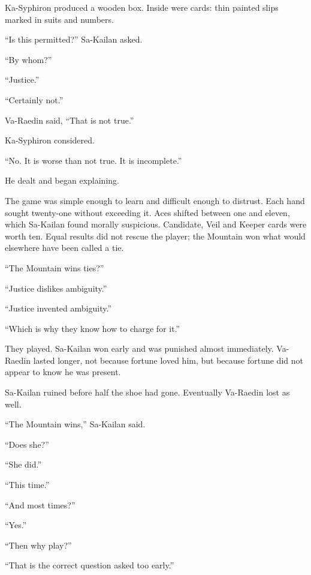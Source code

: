 Ka-Syphiron produced a wooden box.
Inside were cards: thin painted slips marked in suits and numbers.\par

“Is this permitted?” Sa-Kailan asked.\par

“By whom?”\par

“Justice.”\par

“Certainly not.”\par

Va-Raedin said, “That is not true.”\par

Ka-Syphiron considered.\par

“No.
It is worse than not true.
It is incomplete.”\par

He dealt and began explaining.\par

The game was simple enough to learn and difficult enough to distrust.
Each hand sought twenty-one without exceeding it.
Aces shifted between one and eleven, which Sa-Kailan found morally suspicious.
Candidate, Veil and Keeper cards were worth ten.
Equal results did not rescue the player; the Mountain won what would elsewhere have been called a tie.\par

“The Mountain wins ties?”\par

“Justice dislikes ambiguity.”\par

“Justice invented ambiguity.”\par

“Which is why they know how to charge for it.”\par

They played.
Sa-Kailan won early and was punished almost immediately.
Va-Raedin lasted longer, not because fortune loved him, but because fortune did not appear to know he was present.\par

Sa-Kailan ruined before half the shoe had gone.
Eventually Va-Raedin lost as well.\par

“The Mountain wins,” Sa-Kailan said.\par
“Does she?”\par
“She did.”\par
“This time.”\par
“And most times?”\par
“Yes.”\par
“Then why play?”\par
“That is the correct question asked too early.”\par

